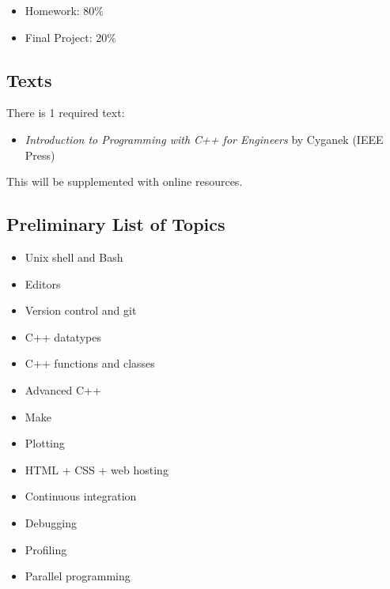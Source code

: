 \documentclass[10pt]{article}
\newenvironment{itemsquish}
  { \begin{itemize}
    \addtolength{\itemsep}{-0.25\baselineskip}
    \addtolength{\baselineskip}{-0.25\baselineskip} }
  { \end{itemize} }
\begin{document}
\begin{itemsquish}
\item Homework: 80\%
\item Final Project: 20\%
\end{itemsquish}


\subsection*{Texts}

\noindent There is 1 required text:

\begin{itemize}
\item {\em Introduction to Programming with C++ for Engineers} by Cyganek (IEEE Press)
\end{itemize}

This will be supplemented with online resources.


\subsection*{ Preliminary List of Topics}

\begin{itemize}

\item Unix shell and Bash

\item Editors

\item Version control and git

\item C++ datatypes

\item C++ functions and classes

\item Advanced C++

\item Make

\item Plotting

\item HTML + CSS + web hosting

\item Continuous integration

\item Debugging

\item Profiling

\item Parallel programming

\end{itemize}
\end{document}
